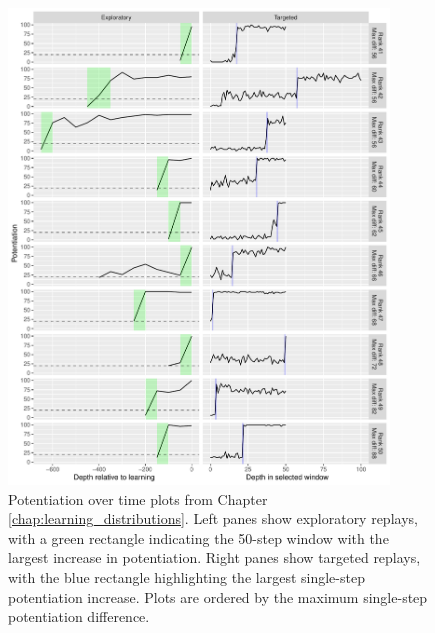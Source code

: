 \begin{figure}[!h]
    \begin{center}
    \includegraphics[width=0.9\textwidth]{07_appendix_potentiation_over_time/media/reps_41_50.pdf}
    \caption{Potentiation over time plots from Chapter \ref{chap:learning_distributions}.
    Left panes show exploratory replays, with a green rectangle indicating the 50-step window with the largest increase in potentiation. 
    Right panes show targeted replays, with the blue rectangle highlighting the largest single-step potentiation increase.
    Plots are ordered by the maximum single-step potentiation difference.}
    \label{fig:app_a_41_50}
    \end{center}
\end{figure}


